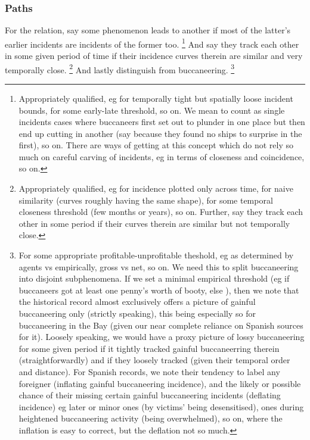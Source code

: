 		\subsubsection{Paths} %
		For the relation, say some phenomenon  leads to another if most of the latter's earlier incidents are incidents of the former too.%
		\footnote{Appropriately qualified, eg for temporally tight but spatially loose incident bounds, for some early-late threshold, so on. We mean to count as single incidents cases where buccaneers first set out to plunder in one place but then end up cutting in another (say because they found no ships to surprise in the first), so on. There are ways of getting at this concept which do not rely so much on careful carving of incidents, eg in terms of closeness and coincidence, so on.}
		And say they  track each other in some given period of time if their incidence curves therein are similar and very temporally close.%
		\footnote{Appropriately qualified, eg for incidence plotted only across time, for naive similarity (curves roughly having the same shape), for some temporal closeness threshold (few months or years), so on. Further, say they  track each other in some period if their curves therein are similar but not temporally close.}
		And lastly distinguish  from  buccaneering.%
		\footnote{For some appropriate profitable-unprofitable theshold, eg as determined by agents vs empirically, gross vs net, so on. We need this to split buccaneering into disjoint subphenomena. If we set a minimal empirical threshold (eg  if buccaneers got at least one penny's worth of booty, else ), then we note that the historical record almost exclusively offers a picture of gainful buccaneering only (strictly speaking), this being especially so for buccaneering in the Bay (given our near complete reliance on Spanish sources for it). Loosely speaking, we would have a proxy picture of lossy buccaneering for some given period if it tightly tracked gainful buccaneerring therein (straightforwardly) and if they loosely tracked (given their temporal order and distance). For Spanish records, we note their tendency to label any foreigner  (inflating gainful buccaneering incidence), and the likely or possible chance of their missing certain gainful buccaneering incidents (deflating incidence) eg later or minor ones (by victims' being desensitised), ones during heightened buccaneering activity (being overwhelmed), so on, where the inflation is easy to correct, but the deflation not so much.} %
